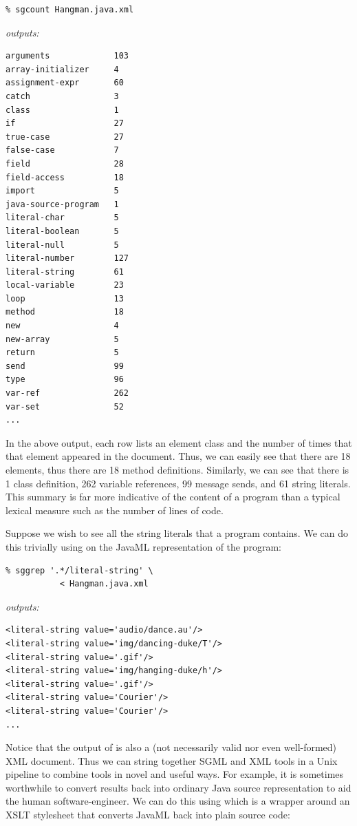 \documentclass{article}
\begin{document}
\begin{multicols}{2}
{\bfseries
\begin{verbatim}
% sgcount Hangman.java.xml
\end{verbatim}
}
\noindent\emph{outputs:}
{\small
\begin{verbatim}
arguments             103
array-initializer     4
assignment-expr       60
catch                 3
class                 1
if                    27
true-case             27
false-case            7
field                 28
field-access          18
import                5
java-source-program   1
literal-char          5
literal-boolean       5
literal-null          5
literal-number        127
literal-string        61
local-variable        23
loop                  13
method                18
new                   4
new-array             5
return                5
send                  99
type                  96
var-ref               262
var-set               52
...
\end{verbatim}
}

In the above output, each row lists an element class and the number of
times that that element appeared in the document.  Thus, we can easily
see that there are 18  elements, thus there are 18
method definitions.  Similarly, we can see that there is 1 class
definition, 262 variable references, 99 message sends, and 61 string
literals.  This summary is far more indicative of the content of a
program than a typical lexical measure such as the number of lines of
code.

Suppose we wish to see all the string literals that a program contains.
We can do this trivially using  on the JavaML
representation of the program:

\begin{verbatim}
% sggrep '.*/literal-string' \
           < Hangman.java.xml
\end{verbatim}

\noindent\emph{outputs:}
{\small
\begin{verbatim}
<literal-string value='audio/dance.au'/>
<literal-string value='img/dancing-duke/T'/>
<literal-string value='.gif'/>
<literal-string value='img/hanging-duke/h'/>
<literal-string value='.gif'/>
<literal-string value='Courier'/>
<literal-string value='Courier'/>
...
\end{verbatim}
}

\noindent Notice that the output of  is also a (not necessarily
valid nor even well-formed) XML document.  Thus we can string together
SGML and XML tools in a Unix pipeline to combine tools in novel and
useful ways.  For example, it is sometimes worthwhile to convert results back into
ordinary Java source representation to aid the human software-engineer.
We can do this using  which is a
wrapper around an XSLT stylesheet that converts JavaML back into
plain source code:


\end{multicols}
\end{document}
